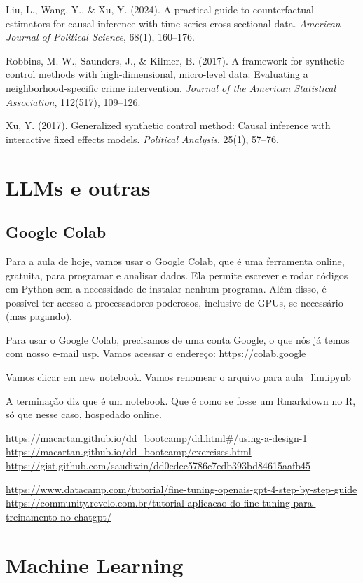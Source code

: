 \documentclass[
]{article}
\begin{document}
Liu, L., Wang, Y., \& Xu, Y. (2024). A practical guide to counterfactual estimators for causal inference with time-series cross-sectional data. \emph{American Journal of Political Science}, 68(1), 160--176.

Robbins, M. W., Saunders, J., \& Kilmer, B. (2017). A framework for synthetic control methods with high-dimensional, micro-level data: Evaluating a neighborhood-specific crime intervention. \emph{Journal of the American Statistical Association}, 112(517), 109--126.

Xu, Y. (2017). Generalized synthetic control method: Causal inference with interactive fixed effects models. \emph{Political Analysis}, 25(1), 57--76.

\section{LLMs e outras}\label{llms-e-outras}

\subsection{Google Colab}\label{google-colab}

Para a aula de hoje, vamos usar o Google Colab, que é uma ferramenta online, gratuita, para programar e analisar dados. Ela permite escrever e rodar códigos em Python sem a necessidade de instalar nenhum programa. Além disso, é possível ter acesso a processadores poderosos, inclusive de GPUs, se necessário (mas pagando).

Para usar o Google Colab, precisamos de uma conta Google, o que nós já temos com nosso e-mail usp.
Vamos acessar o endereço: \url{https://colab.google}

Vamos clicar em new notebook.
Vamos renomear o arquivo para aula\_llm.ipynb

A terminação diz que é um notebook. Que é como se fosse um Rmarkdown no R, só que nesse caso, hospedado online.

\url{https://macartan.github.io/dd_bootcamp/dd.html\#/using-a-design-1}
\url{https://macartan.github.io/dd_bootcamp/exercises.html}
\url{https://gist.github.com/saudiwin/dd0edec5786c7edb393bd84615aafb45}

\url{https://www.datacamp.com/tutorial/fine-tuning-openais-gpt-4-step-by-step-guide}
\url{https://community.revelo.com.br/tutorial-aplicacao-do-fine-tuning-para-treinamento-no-chatgpt/}

\section{Machine Learning}\label{machine-learning}
\end{document}
